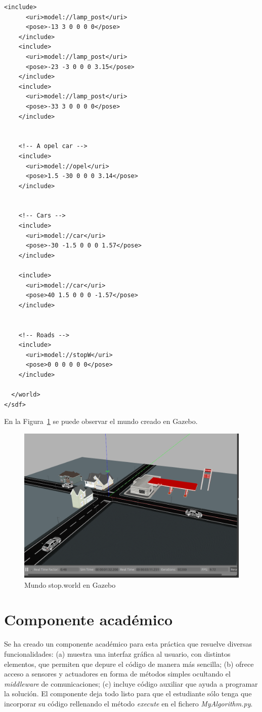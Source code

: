 \begin{lstlisting}[frame=single]
    <include>
      <uri>model://lamp_post</uri>
      <pose>-13 3 0 0 0 0</pose>
    </include>
    <include>
      <uri>model://lamp_post</uri>
      <pose>-23 -3 0 0 0 3.15</pose>
    </include>
    <include>
      <uri>model://lamp_post</uri>
      <pose>-33 3 0 0 0 0</pose>
    </include>
    

    <!-- A opel car -->
    <include>
      <uri>model://opel</uri>
      <pose>1.5 -30 0 0 0 3.14</pose> 
    </include>
    
    
    <!-- Cars -->
    <include>
      <uri>model://car</uri>
      <pose>-30 -1.5 0 0 0 1.57</pose>
    </include>
    
    <include>
      <uri>model://car</uri>
      <pose>40 1.5 0 0 0 -1.57</pose>
    </include>
    
    
    <!-- Roads -->
    <include>
      <uri>model://stopW</uri>
      <pose>0 0 0 0 0 0</pose>
    </include>
    
  </world>
</sdf>
	\end{lstlisting}


En la Figura~\ref{fig.stopWorld} se puede observar el mundo creado en Gazebo.

\begin{figure}[H]
  \begin{center}
    \includegraphics[width=1.0\textwidth]{figures/Stop/stopWorld.png}
		\caption{Mundo stop.world en Gazebo}
		\label{fig.stopWorld}
		\end{center}
\end{figure}


\section{Componente académico}
Se ha creado un componente académico para esta práctica que resuelve diversas funcionalidades: (a) muestra una interfaz gráfica al usuario, con distintos elementos, que permiten que depure el código de manera más sencilla; (b) ofrece acceso a sensores y actuadores en forma de métodos simples ocultando el \textit{middleware} de comunicaciones; (c) incluye código auxiliar que ayuda a programar la solución. El componente deja todo listo para que el estudiante sólo tenga que incorporar su código rellenando el método \textit{execute} en el fichero \textit{MyAlgorithm.py}.\\

